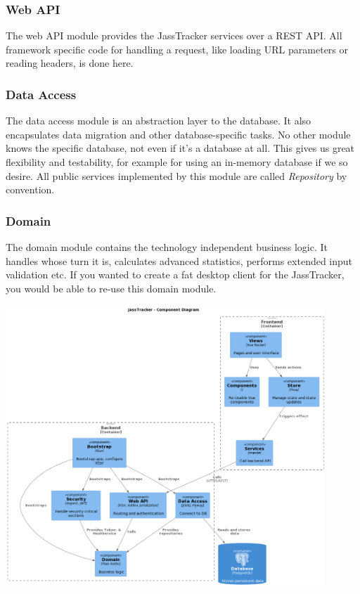 \subsubsection*{Web API}
The web API module provides the JassTracker services over a REST API\@.
All framework specific code for handling a request, like loading URL parameters or reading headers, is done here.

\subsubsection*{Data Access}
The data access module is an abstraction layer to the database.
It also encapsulates data migration and other database-specific tasks.
No other module knows the specific database, not even if it's a database at all.
This gives us great flexibility and testability, for example for using an in-memory database if we so desire.
All public services implemented by this module are called \emph{Repository} by convention.

\subsubsection*{Domain}
The domain module contains the technology independent business logic.
It handles whose turn it is, calculates advanced statistics, performs extended input validation etc.
If you wanted to create a fat desktop client for the JassTracker, you would be able to re-use this domain module.

\includegraphics[width=0.9\textwidth]{resources/diagrams/c4-3-component}

